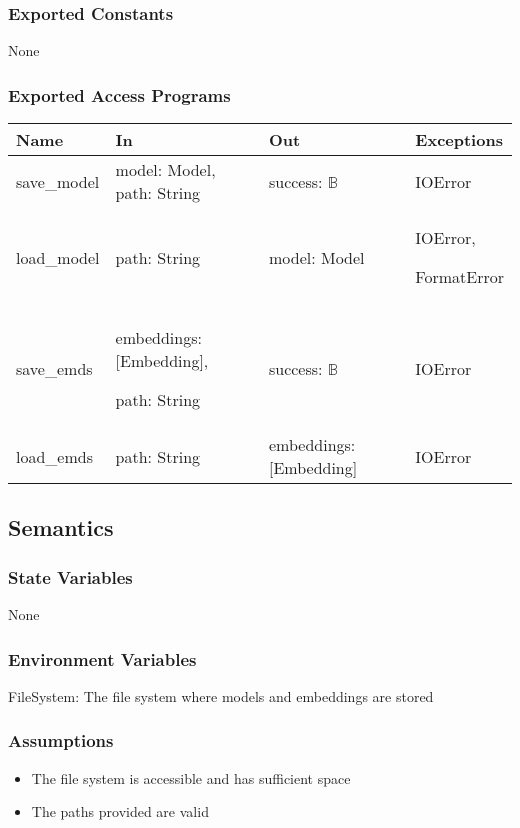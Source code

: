 \documentclass[12pt, titlepage]{article}
\begin{document}
\subsubsection{Exported Constants}
None
\subsubsection{Exported Access Programs}

\begin{center}
\begin{tabular}{p{2cm} p{4cm} p{4cm} p{2cm}}
\hline
\textbf{Name} & \textbf{In} & \textbf{Out} & \textbf{Exceptions} \\
\hline
save\_model & model: Model, path: String & success: $\mathbb{B}$ & IOError \\
\hline
load\_model & path: String & model: Model & IOError,

FormatError \\
\hline
save\_emds & embeddings: [Embedding],

path: String & success: $\mathbb{B}$ & IOError \\
\hline
load\_emds & path: String & embeddings: [Embedding] & IOError \\
\hline
\end{tabular}
\end{center}

\subsection{Semantics}

\subsubsection{State Variables}
None

\subsubsection{Environment Variables}

FileSystem: The file system where models and embeddings are stored

\subsubsection{Assumptions}

\begin{itemize}
  \item The file system is accessible and has sufficient space
  \item The paths provided are valid
\end{itemize}
\end{document}
